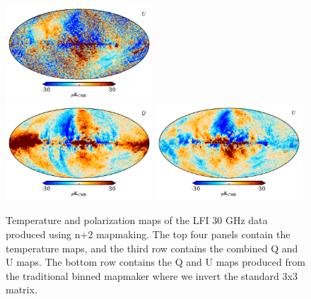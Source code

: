 \documentclass{aa}
\begin{document}
\begin{figure}[!]
  \includegraphics[width=0.49\textwidth]{figs/map_U_badpol.pdf}\\
    \includegraphics[width=0.49\textwidth]{figs/map_Q_binned.pdf}
  \includegraphics[width=0.49\textwidth]{figs/map_U_binned.pdf}\\
  \caption{Temperature and polarization maps of the LFI 30 GHz data produced using n+2 mapmaking. The top four panels contain the temperature maps, and the third row contains the combined Q and U maps. The bottom row contains the Q and U maps produced from the traditional binned mapmaker where we invert the standard 3x3 matrix. \newline \newline \newline}
  \label{fig:maps}
\end{figure}
\end{document}
